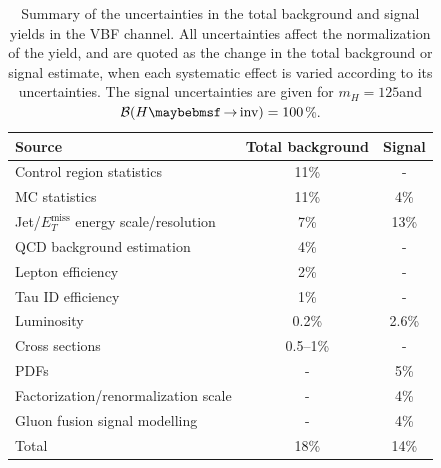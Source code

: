 
\begin{table}[!htb]
\centering
\begin{tabular}{|l|c|c|}
\hline
Source                                           & Total background & Signal \\
\hline\hline
Control region statistics                        & 11\%             & -      \\
MC statistics                                    & 11\%             & 4\%    \\
Jet/$E_T^{\text{miss}}$ energy scale/resolution  & 7\%              & 13\%   \\
QCD background estimation                        & 4\%              & -      \\
Lepton efficiency                                & 2\%              & -      \\
Tau ID efficiency                                & 1\%              & -      \\
Luminosity                                       & 0.2\%            & 2.6\%  \\
Cross sections                                   & 0.5--1\%         & -      \\
PDFs                                             & -                & 5\%    \\
Factorization/renormalization scale              & -                & 4\%    \\
Gluon fusion signal modelling                    & -                & 4\%    \\
\hline\hline
Total                                            & 18\%             & 14\%   \\
\hline 
\end{tabular}
\caption{Summary of the uncertainties in the total background and signal yields in the VBF channel. All uncertainties affect the normalization of the yield, and are quoted as the change in the total background or signal estimate, when each systematic effect is varied according to its uncertainties. The signal uncertainties are given for $m_H=125$\GeV and $\BRinv=100$\%. \cite{ARTICLE:CMSVBFHiggsToInvAndZHCombination}}
\label{TABLE:PromptDataAnalysis_SourcesUncertaintySummary}
\end{table}


